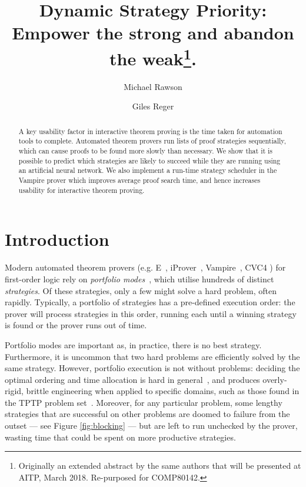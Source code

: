 \documentclass{scrartcl}
\title{Dynamic Strategy Priority: \\ Empower the strong and abandon the weak\footnote{Originally an extended abstract by the same authors that will be presented at AITP, March 2018. Re-purposed for COMP80142.}.}
\author{
 Michael Rawson \and 
 Giles Reger
}
\newcommand{\vampire}{{Vampire}}
\newcommand{\iprover}{iProver}
\newcommand{\E}{{\textsc E}}
\begin{document}
\maketitle
\begin{abstract}
\noindent
A key usability factor in interactive theorem proving is the time taken for automation tools to complete.
Automated theorem provers run lists of proof strategies sequentially, which can cause proofs to be found more slowly than necessary.
We show that it is possible to predict which strategies are likely to succeed while they are running using an artificial neural network.
We also implement a run-time strategy scheduler in the \vampire{} prover which improves average proof search time, and hence increases usability for interactive theorem proving.
\end{abstract}

\section{Introduction}
Modern automated theorem provers (e.g. \E{}~\cite{E}, \iprover{}~\cite{iProver}, \vampire{}~\cite{Vampire}, CVC4 \cite{CVC4}) for first-order logic rely on \emph{portfolio modes}~\cite{portfolio}, which utilise hundreds of distinct \emph{strategies}.
Of these strategies, only a few might solve a hard problem, often rapidly.
Typically, a portfolio of strategies has a pre-defined execution order: the prover will process strategies in this order, running each until a winning strategy is found or the prover runs out of time.

Portfolio modes are important as, in practice, there is no best strategy.
Furthermore, it is uncommon that two hard problems are efficiently solved by the same strategy.
However, portfolio execution is not without problems: deciding the optimal ordering and time allocation is hard in general~\cite{predict-success}, and produces overly-rigid, brittle engineering when applied to specific domains, such as those found in the TPTP problem set~\cite{TPTP}.
Moreover, for any particular problem, some lengthy strategies that are successful on other problems are doomed to failure from the outset --- see Figure \ref{fig:blocking} --- but are left to run unchecked by the prover, wasting time that could be spent on more productive strategies.
\end{document}

